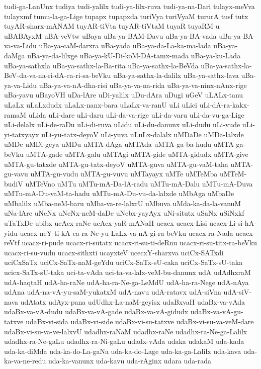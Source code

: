 {tudi-ga-LanUnx
tudiya
tudi-yalilx
tudi-ya-lilx-ruva
tudi-ya-na-Dari
tulayx-meVva
tulayxmf
tumu-la-ga-Lige
tupapx
tupapxda
turiVya
turiVyaM
tururA
tusf
tutx
tuyAR-sharx-mANAM
tuyAR-tiVta
tuyAR-tiVtaM
tuyaR
tuyaRM
u
uBABAyxM
uBA-veVtw
uBaya
uBa-ya-BAM-Davu
uBa-ya-BA-vada
uBa-ya-BA-va-va-Lidu
uBa-ya-caM-darxra
uBa-yada
uBa-ya-da-La-ka-ma-lada
uBa-ya-daMga
uBa-ya-da-lilxge
uBa-ya-kU-Di-koM-DA-tamx-mada
uBa-ya-ku-Lada
uBa-ya-sathxla
uBa-ya-sathx-la-Ba-rita
uBa-ya-sathx-la-BeVda
uBa-ya-sathx-la-BeV-da-va-na-ri-dA-ca-ri-sa-beVku
uBa-ya-sathx-la-dalilx
uBa-ya-sathx-lava
uBa-ya-va-Lidu
uBa-ya-va-nA-dha-risi
uBa-ya-va-na-rida
uBa-ya-va-ninx-nAnx-rige
uBa-yavu
uBayoVH
uDa-lAre
uDi-yalilx
uDu-dAra
uDugi
uGeV
uLALx-tanu
uLaLx
uLaLxdudx
uLaLx-nanx-bara
uLaLx-va-ranU
uLi
uLici
uLi-dA-ra-kakx-ramaM
uLida
uLi-dare
uLi-daru
uLi-da-va-rige
uLi-da-varu
uLi-da-vu-ga-Lige
uLi-delalx
uLi-de-raDu
uLi-di-ruva
uLidu
uLi-du-danunx
uLi-dudu
uLi-vude
uLi-yi-tatxyayx
uLi-yu-tatx-deyoV
uLi-yuva
uLuLx-dalalx
uMDaDe
uMDa-lalxde
uMDe
uMDi-geya
uMDu
uMTA-dAga
uMTAda
uMTA-ga-ba-hudu
uMTA-ga-beVku
uMTA-gade
uMTA-galu
uMTAgi
uMTA-gide
uMTA-gidudx
uMTA-give
uMTA-gu-tatxde
uMTA-gu-tatx-deyoV
uMTA-guva
uMTA-gu-vaM-taha
uMTA-gu-vavu
uMTA-gu-vudu
uMTA-gu-vuvu
uMTayayx
uMTe
uMTeMba
uMTeM-budiV
uMTeVno
uMTu
uMTu-mA-Da-lA-radu
uMTu-mA-Dalu
uMTu-mA-Duva
uMTu-mA-Du-vaM-ta-hadu
uMTu-mA-Du-vu-da-lalxde
uMbAga
uMbaDe
uMbalilx
uMba-neM-baru
uMba-va-re-lalxrU
uMbuva
uMda-ka-da-la-vanuM
uNa-lAre
uNeNx
uNeNx-neM-daDe
uNebx-yayAyx
uNi-situtx
uSaNx
uSiNxkf
uTaTxDe
ubibx
ucAcx-raNe
ucAcx-yaR-mANaH
ucacx
ucacx-Lisi
ucacx-Li-si-hA-yidu
ucacx-neY-ti-kA-ca-ra-Ne-yu-LaLx-va-nA-gi-ra-beVku
ucacx-ra-Nada
ucacx-reVtf
ucacx-ri-pude
ucacx-ri-sutatx
ucacx-ri-su-ti-deRnu
ucacx-ri-su-titx-ra-beVku
ucacx-ri-su-vudu
ucacx-sithxti
ucayxteV
ucecxY-sharxva
uciCx-SATxdi
uciCxSaTx
uciCx-SaTx-naM-geYdu
uciCx-SaTx-sU-caka
uciCx-SaTx-sU-taka
ucicx-SaTx-sU-taka
uci-ta-vAda
uci-ta-va-lalx-veM-bu-danunx
udA
udAdhxraM
udA-haqtaH
udA-ha-raNe
udA-ha-ra-Ne-ga-LeMdU
udA-ha-ra-Nege
udA-nAya
udAna
udA-na-vA-yu-saM-yukatxM
udA-navu
udA-ratavx
udA-siVna
udA-siV-nava
udAtatx
udAyx-pana
udUdhx-La-naM-geyisx
udaBxvaH
udaBx-va-vAda
udaBx-va-vA-dudu
udaBx-va-vA-gade
udaBx-va-vA-gidudx
udaBx-va-vA-gu-tatxve
udaBx-vi-sida
udaBx-vi-side
udaBx-vi-su-tatxve
udaBx-vi-su-va-veM-dare
udaBx-vi-su-va-ve-lalxvU
udadhx-raNaM
udadhx-raNe
udadhx-ra-Ne-ga-Lalilx
udadhx-ra-Ne-gaLu
udadhx-ra-Ni-gaLu
udadx-vAda
udaka
udakaM
uda-kada
uda-ka-diMda
uda-ka-do-La-gaNa
uda-ka-do-Lage
uda-ka-ga-Lalilx
uda-kava
uda-ka-va-ne-redu
uda-ka-vanunx
uda-kavu
uda-rAginx
udara
uda-rada
}
